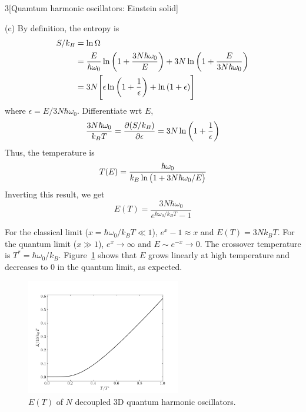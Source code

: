 \documentclass[12pt]{article}
\begin{document}
\begin{problem}{3}[Quamtum harmonic oscillators: Einstein solid]
\begin{solution}
(c) By definition, the entropy is
\begin{align}
    S/k_B
    &=\ln\Omega\notag\\
    &=\frac{E}{\hbar\omega_0}\ln\qty(1+\frac{3N\hbar\omega_0}{E})
    +3N\ln\qty(1+\frac{E}{3N\hbar\omega_0})\notag\\
    &=3N\qty[\epsilon\ln\qty(1+\frac1\epsilon)+\ln\qty(1+\epsilon)]
\end{align}
where $\epsilon=E/3N\hbar\omega_0$. Differentiate wrt $E$,
\begin{equation}
    \frac{3N\hbar\omega_0}{k_BT}=\frac{\partial (S/k_B)}{\partial\epsilon}
    =3N\ln\qty(1+\frac1\epsilon)
\end{equation}
Thus, the temperature is
\begin{equation}
    T(E)=\frac{\hbar\omega_0}{k_B\ln\qty(1+3N\hbar\omega_0/E)} 
\end{equation}
Inverting this result, we get
\begin{equation}
    E(T)=\frac{3N\hbar\omega_0}{e^{\hbar\omega_0/k_BT}-1} 
\end{equation}

For the classical limit ($x=\hbar\omega_0/k_BT\ll 1$), $e^x-1\approx x$ and
$E(T)=3Nk_BT$. For the quantum limit ($x\gg1$), $e^x\to\infty$ and $E\sim
e^{-x}\to0$. The crossover temperature is $T^\ast=\hbar\omega_0/k_B$.
Figure~\ref{fig:p3c} shows that $E$ grows linearly at high temperature and
decreases to 0 in the quantum limit, as expected.
\begin{figure}[H]
    \centering
    \includegraphics[width=0.6\textwidth]{p3c.png}
    \caption{$E(T)$ of $N$ decoupled 3D quantum harmonic oscillators.}
    \label{fig:p3c}
\end{figure}


\end{solution}
\end{problem}
\end{document}
